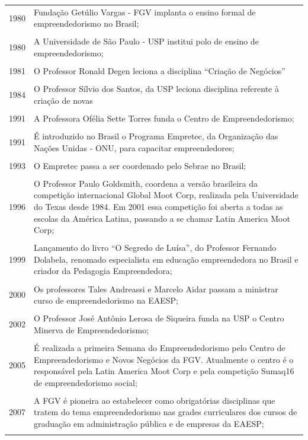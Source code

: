 \begin{longtable}{lp{12cm}}
1980 & Fundação Getúlio Vargas - FGV implanta o ensino formal de empreendedorismo no Brasil;  \\\\\hline
1980 & A Universidade de São Paulo - USP institui polo de ensino de empreendedorismo;  \\\\\hline
1981 & O Professor Ronald Degen leciona a disciplina “Criação de Negócios”  \\\\ \hline
1984 & O Professor Sílvio dos Santos, da USP leciona disciplina referente à criação de novas \\\\ \hline
1991 & A Professora Ofélia Sette Torres funda o Centro de Empreendedorismo;  \\\\\hline
1991 & É introduzido no Brasil o Programa Empretec, da Organização das Nações Unidas - ONU, para
capacitar empreendedores;  \\\\\hline
1993 & O Empretec passa a ser coordenado pelo Sebrae no Brasil;  \\\\ \hline
1996 & O Professor Paulo Goldsmith, coordena a versão brasileira da competição internacional Global Moot Corp, realizada pela Universidade do Texas desde 1984. Em 2001 essa competição foi aberta a todas as escolas da América Latina, passando a se chamar Latin America Moot Corp;\\\\ \hline
1999 & Lançamento do livro “O Segredo de Luísa”, do Professor Fernando Dolabela, renomado
especialista em educação empreendedora no Brasil e criador da Pedagogia Empreendedora;  \\\\ \hline
2000 & Os professores Tales Andreassi e Marcelo Aidar passam a ministrar curso de empreendedorismo
na EAESP;  \\\\ \hline
2002 & O Professor José Antônio Lerosa de Siqueira funda na USP o Centro Minerva de Empreendedorismo;  \\\\\hline 
 2005 & É realizada a primeira Semana do Empreendedorismo pelo Centro de Empreendedorismo e Novos Negócios da FGV. Atualmente o centro é o responsável pela Latin America Moot Corp e pela competição Sumaq16 de empreendedorismo social;  \\\\ \hline 
 2007 & A FGV é pioneira ao estabelecer como obrigatórias disciplinas que tratem do tema empreendedorismo nas grades curriculares dos cursos de graduação em administração pública e de empresas da EAESP; \\\\ \hline

\end{longtable}


